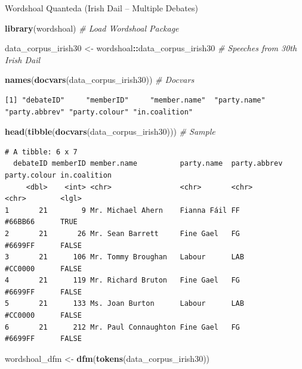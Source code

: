 \documentclass[
  ignorenonframetext,
  aspectratio=169]{beamer}
\newenvironment{Shaded}{\begin{snugshade}}{\end{snugshade}}
\newcommand{\CommentTok}[1]{\textcolor[rgb]{0.56,0.35,0.01}{\textit{#1}}}
\newcommand{\FunctionTok}[1]{\textcolor[rgb]{0.13,0.29,0.53}{\textbf{#1}}}
\newcommand{\NormalTok}[1]{#1}
\newcommand{\OtherTok}[1]{\textcolor[rgb]{0.56,0.35,0.01}{#1}}
\newcommand{\SpecialCharTok}[1]{\textcolor[rgb]{0.81,0.36,0.00}{\textbf{#1}}}
\begin{document}
\begin{frame}[fragile]{Wordshoal Quanteda (Irish Dail -- Multiple
Debates)}
\label{wordshoal-quanteda-irish-dail-multiple-debates}
\scriptsize

\begin{Shaded}
\begin{Highlighting}[]
\FunctionTok{library}\NormalTok{(wordshoal) }\CommentTok{\# Load Wordshoal Package }

\NormalTok{data\_corpus\_irish30 }\OtherTok{\textless{}{-}}\NormalTok{ wordshoal}\SpecialCharTok{::}\NormalTok{data\_corpus\_irish30 }\CommentTok{\# Speeches from 30th Irish Dail}

\FunctionTok{names}\NormalTok{(}\FunctionTok{docvars}\NormalTok{(data\_corpus\_irish30)) }\CommentTok{\# Docvars}
\end{Highlighting}
\end{Shaded}

\begin{verbatim}
[1] "debateID"     "memberID"     "member.name"  "party.name"   "party.abbrev" "party.colour" "in.coalition"
\end{verbatim}

\begin{Shaded}
\begin{Highlighting}[]
\FunctionTok{head}\NormalTok{(}\FunctionTok{tibble}\NormalTok{(}\FunctionTok{docvars}\NormalTok{(data\_corpus\_irish30))) }\CommentTok{\# Sample}
\end{Highlighting}
\end{Shaded}

\begin{verbatim}
# A tibble: 6 x 7
  debateID memberID member.name          party.name  party.abbrev party.colour in.coalition
     <dbl>    <int> <chr>                <chr>       <chr>        <chr>        <lgl>       
1       21        9 Mr. Michael Ahern    Fianna Fáil FF           #66BB66      TRUE        
2       21       26 Mr. Sean Barrett     Fine Gael   FG           #6699FF      FALSE       
3       21      106 Mr. Tommy Broughan   Labour      LAB          #CC0000      FALSE       
4       21      119 Mr. Richard Bruton   Fine Gael   FG           #6699FF      FALSE       
5       21      133 Ms. Joan Burton      Labour      LAB          #CC0000      FALSE       
6       21      212 Mr. Paul Connaughton Fine Gael   FG           #6699FF      FALSE       
\end{verbatim}

\begin{Shaded}
\begin{Highlighting}[]
\NormalTok{wordshoal\_dfm }\OtherTok{\textless{}{-}} \FunctionTok{dfm}\NormalTok{(}\FunctionTok{tokens}\NormalTok{(data\_corpus\_irish30))}


\end{Highlighting}
\end{Shaded}
\end{frame}
\end{document}
